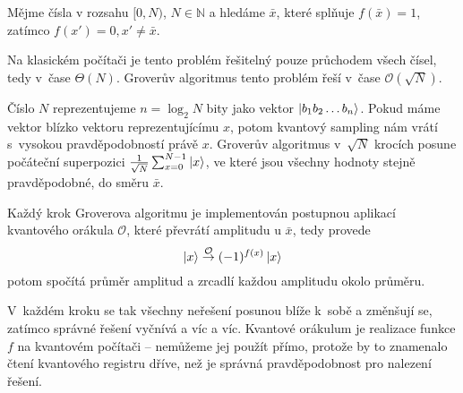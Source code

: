 Mějme čísla v rozsahu $[0, N)$, $N \in \mathbb{N}$ a hledáme
$\bar x$, které splňuje $f(\bar x) = 1$, zatímco $f(x') = 0, x' \neq
\bar x$.

Na klasickém počítači je tento problém řešitelný pouze průchodem všech
čísel, tedy v~čase $\Theta(N)$.
Groverův algoritmus tento problém řeší v~čase $\mathcal{O}(\sqrt{N})$.

Číslo $N$ reprezentujeme $n = \log_2 N$ bity jako vektor
$\ket{b_1 b_2 \ldots b_n}$. Pokud máme vektor blízko vektoru
reprezentujícímu $x$, potom kvantový sampling nám vrátí s~vysokou
pravděpodobností právě $x$. Groverův algoritmus v~$\sqrt{N}$ krocích
posune počáteční superpozici $\frac{1}{\sqrt{N}} \sum_{x = 0}^{N-1}
\ket{x}$, ve které jsou všechny hodnoty stejně pravděpodobné,
do směru $\bar x$.

\pagebreak

Každý krok Groverova algoritmu je implementován postupnou aplikací
kvantového orákula $\mathcal{O}$, které převrátí amplitudu u $\bar x$,
tedy provede
\[
    \ket{x} \stackrel{\mathcal{O}}{\to} (-1)^{f(x)} \ket{x}
\]
potom spočítá průměr amplitud a zrcadlí každou amplitudu okolo průměru.

V~každém kroku se tak všechny neřešení posunou blíže k~sobě a změnšují
se, zatímco správné řešení vyčnívá a víc a víc. Kvantové orákulum je
realizace funkce $f$ na kvantovém počítači -- nemůžeme jej použít přímo,
protože by to znamenalo čtení kvantového registru dříve, než je správná
pravděpodobnost pro nalezení řešení.
